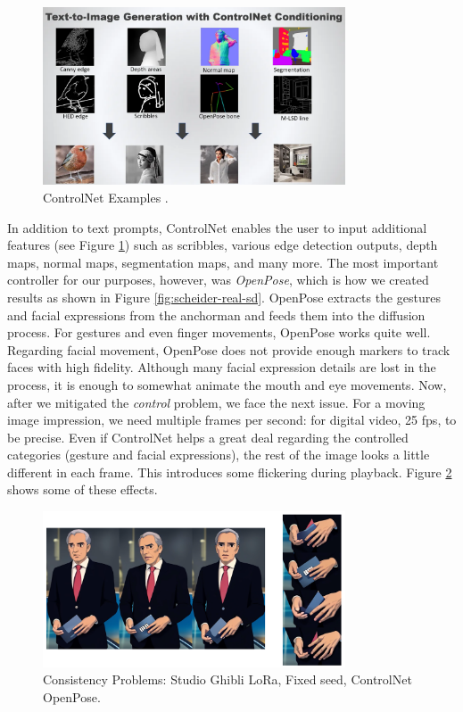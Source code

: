 \documentclass[
  a4paper,  %
  twoside,  %
  bibliography=totoc,
  headsepline,
  cleardoublepage=empty,
  parskip=half,
  draft=false
]{scrbook}
\begin{document}
\begin{figure}[h]
  \centering
  \includegraphics[width=0.8\textwidth]{./graphics/diffusion/ControlNet.png}
  \caption{ControlNet Examples \cite{foongIntroductionControlNetStable2023}.}
  \label{fig:ControlNet}
\end{figure}

In addition to text prompts, ControlNet enables the user to input additional features (see Figure \ref{fig:ControlNet}) such as scribbles, various edge detection outputs, depth maps, normal maps, segmentation maps, and many more. The most important controller for our purposes, however, was \textit{OpenPose}, which is how we created results as shown in Figure \ref{fig:scheider-real-sd}. OpenPose extracts the gestures and facial expressions from the anchorman and feeds them into the diffusion process. For gestures and even finger movements, OpenPose works quite well. Regarding facial movement, OpenPose does not provide enough markers to track faces with high fidelity. Although many facial expression details are lost in the process, it is enough to somewhat animate the mouth and eye movements.
Now, after we mitigated the \textit{control} problem, we face the next issue. For a moving image impression, we need multiple frames per second: for digital video, 25 \gls{fps}, to be precise. Even if ControlNet helps a great deal regarding the controlled categories (gesture and facial expressions), the rest of the image looks a little different in each frame. This introduces some flickering during playback. Figure \ref{fig:controlnet-issues} shows some of these effects.

\begin{figure}[h]
  \centering
  \includegraphics[width=0.8\textwidth]{./graphics/diffusion/ControlNet-issues.png}
  \caption{Consistency Problems: Studio Ghibli LoRa, Fixed seed, ControlNet OpenPose.}
  \label{fig:controlnet-issues}
\end{figure}
\end{document}
